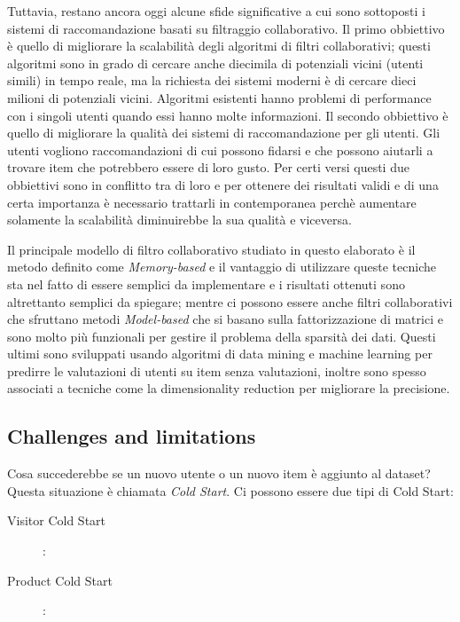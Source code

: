 Tuttavia, restano ancora oggi alcune sfide significative a cui sono sottoposti i sistemi di raccomandazione basati su 
filtraggio collaborativo.
Il primo obbiettivo è quello di migliorare la scalabilità degli algoritmi di filtri collaborativi; questi algoritmi sono in grado di cercare
anche diecimila di potenziali vicini (utenti simili) in tempo reale, ma la richiesta dei sistemi moderni è di cercare dieci milioni di 
potenziali vicini. Algoritmi esistenti hanno problemi di performance con i singoli utenti quando essi hanno molte informazioni.
Il secondo obbiettivo è quello di migliorare la qualità dei sistemi di raccomandazione per gli utenti. Gli utenti vogliono
raccomandazioni di cui possono fidarsi e che possono aiutarli a trovare item che potrebbero essere di loro gusto.
Per certi versi questi due obbiettivi sono in conflitto tra di loro e per ottenere dei risultati validi e di una certa importanza è 
necessario trattarli in contemporanea perchè aumentare solamente la scalabilità diminuirebbe la sua qualità e viceversa. 
\cite{item-based-collaborative-filtering} 

Il principale modello di filtro collaborativo studiato in questo elaborato è il metodo definito come \textit{Memory-based} e il 
vantaggio di utilizzare queste tecniche sta nel fatto di essere semplici da implementare e i risultati ottenuti sono altrettanto 
semplici da spiegare; mentre ci possono essere anche filtri collaborativi che sfruttano metodi \textit{Model-based} che si basano sulla 
fattorizzazione di matrici e sono molto più funzionali per gestire il problema della sparsità dei dati. Questi ultimi sono sviluppati
usando algoritmi di data mining e machine learning per predirre le valutazioni di utenti su item senza valutazioni, inoltre sono spesso 
associati a tecniche come la dimensionality reduction per migliorare la precisione.



\subsection{Challenges and limitations} \hfill \break
Cosa succederebbe se un nuovo utente o un nuovo item è aggiunto al dataset? Questa situazione è chiamata \textit{Cold Start}. Ci possono
essere due tipi di Cold Start:
\begin{description}
	\item[Visitor Cold Start]:
	\item[Product Cold Start]: 
\end{description}

